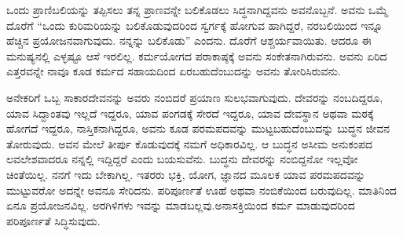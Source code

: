 ಒಂದು ಪ್ರಾಣಿಬಲಿಯನ್ನು ತಪ್ಪಿಸಲು ತನ್ನ ಪ್ರಾಣವನ್ನೇ ಬಲಿಕೊಡಲು ಸಿದ್ಧನಾಗಿದ್ದ\-ವನು ಅವನೊಬ್ಬನೆ. ಅವನು ಒಮ್ಮೆ ದೊರೆಗೆ “ಒಂದು ಕುರಿಮರಿಯನ್ನು ಬಲಿಕೊಡುವುದರಿಂದ ಸ್ವರ್ಗಕ್ಕೆ ಹೋಗುವ ಹಾಗಿದ್ದರೆ, ನರಬಲಿಯಿಂದ ಇನ್ನೂ ಹೆಚ್ಚಿನ ಪ್ರಯೋಜನ\break ವಾಗುವುದು. ನನ್ನನ್ನು ಬಲಿಕೊಡು” ಎಂದನು. ದೊರೆಗೆ ಆಶ್ಚರ್ಯವಾಯಿತು. ಆದರೂ ಈ ಮನುಷ್ಯನಲ್ಲಿ ಎಳ್ಳಷ್ಟೂ ಆಸೆ ಇರಲಿಲ್ಲ. ಕರ್ಮಯೋಗದ ಪರಾಕಾಷ್ಠಕ್ಕೆ ಅವನು ಸಂಕೇತನಾಗಿರುವನು. ಅವನು ಏರಿದ ಎತ್ತರವನ್ನೇ ನಾವೂ ಕೂಡ ಕರ್ಮದ ಸಹಾಯದಿಂದ ಏರಬಹುದೆಂಬುದನ್ನು ಅವನು ತೋರಿಸಿರುವನು.

ಅನೇಕರಿಗೆ ಒಬ್ಬ ಸಾಕಾರದೇವನನ್ನು ಅವರು ನಂಬಿದರೆ ಪ್ರಯಾಣ ಸುಲಭವಾಗುವುದು. ದೇವರನ್ನು ನಂಬದಿದ್ದರೂ, ಯಾವ ಸಿದ್ದಾಂತವು ಇಲ್ಲದೆ ಇದ್ದರೂ, ಯಾವ ಪಂಗಡಕ್ಕೆ ಸೇರದೆ ಇದ್ದರೂ, ಯಾವ ದೇವಸ್ಥಾನ ಅಥವಾ ಮಠಕ್ಕೆ ಹೋಗದೆ ಇದ್ದರೂ, ನಾಸ್ತಿಕನಾಗಿದ್ದರೂ, ಅವನು ಕೂಡ ಪರಮಪದವನ್ನು ಮುಟ್ಟಬಹುದೆಂಬುದನ್ನು ಬುದ್ಧನ ಜೀವನ ತೋರುವುದು. ಅವನ ಮೇಲೆ ತೀರ್ಪು ಕೊಡುವುದಕ್ಕೆ ನಮಗೆ ಅಧಿಕಾರವಿಲ್ಲ. ಆ ಬುದ್ಧನ ಅಸೀಮ ಅನುಕಂಪದ ಲವಲೇಶವಾದರೂ ನನ್ನಲ್ಲಿ ಇದ್ದಿದ್ದರೆ ಎಂದು ಬಯಸುವೆನು. ಬುದ್ಧನು ದೇವರನ್ನು ನಂಬಿದ್ದನೋ ಇಲ್ಲವೋ ಚಿಂತೆಯಿಲ್ಲ. ನನಗೆ ಇದು ಬೇಕಾಗಿಲ್ಲ. ಇತರರು ಭಕ್ತಿ, ಯೋಗ, ಜ್ಞಾನದ ಮೂಲಕ ಯಾವ ಪರಮಪದವನ್ನು ಮುಟ್ಟುವರೋ ಅದನ್ನೇ ಅವನೂ ಸೇರಿದನು. ಪರಿಪೂರ್ಣತೆ ಊಹೆ ಅಥವಾ ನಂಬಿಕೆಯಿಂದ ಬರುವುದಿಲ್ಲ. ಮಾತಿನಿಂದ ಏನೂ ಪ್ರಯೋಜನವಿಲ್ಲ. ಅರಗಿಳಿಗಳು ಇವನ್ನು ಮಾಡಬಲ್ಲವು.\break ಅನಾಸಕ್ತಿಯಿಂದ ಕರ್ಮ ಮಾಡುವುದರಿಂದ ಪರಿಪೂರ್ಣತೆ ಸಿದ್ಧಿಸುವುದು.

